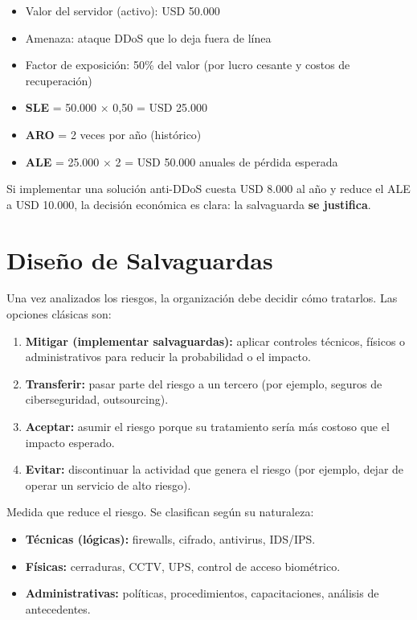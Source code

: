 \documentclass[11pt,a4paper]{article}
\begin{document}
\begin{ejemplo}
\begin{itemize}[leftmargin=*]
  \item Valor del servidor (activo): USD 50.000
  \item Amenaza: ataque DDoS que lo deja fuera de línea
  \item Factor de exposición: 50\% del valor (por lucro cesante y costos de recuperación)
  \item \textbf{SLE} = 50.000 $\times$ 0,50 = USD 25.000
  \item \textbf{ARO} = 2 veces por año (histórico)
  \item \textbf{ALE} = 25.000 $\times$ 2 = USD 50.000 anuales de pérdida esperada
\end{itemize}

Si implementar una solución anti-DDoS cuesta USD 8.000 al año y reduce el ALE a USD 10.000, la decisión económica es clara: la salvaguarda \textbf{se justifica}.
\end{ejemplo}

\section{Diseño de Salvaguardas}
Una vez analizados los riesgos, la organización debe decidir cómo tratarlos. Las opciones clásicas son:

\begin{definicion}
\begin{enumerate}[leftmargin=*]
  \item \textbf{Mitigar (implementar salvaguardas):} aplicar controles técnicos, físicos o administrativos para reducir la probabilidad o el impacto.
  \item \textbf{Transferir:} pasar parte del riesgo a un tercero (por ejemplo, seguros de ciberseguridad, outsourcing).
  \item \textbf{Aceptar:} asumir el riesgo porque su tratamiento sería más costoso que el impacto esperado.
  \item \textbf{Evitar:} discontinuar la actividad que genera el riesgo (por ejemplo, dejar de operar un servicio de alto riesgo).
\end{enumerate}
\end{definicion}

\begin{definicion}
Medida que reduce el riesgo. Se clasifican según su naturaleza:
\begin{itemize}[leftmargin=*]
  \item \textbf{Técnicas (lógicas):} firewalls, cifrado, antivirus, IDS/IPS.
  \item \textbf{Físicas:} cerraduras, CCTV, UPS, control de acceso biométrico.
  \item \textbf{Administrativas:} políticas, procedimientos, capacitaciones, análisis de antecedentes.
\end{itemize}
\end{definicion}
\end{document}
